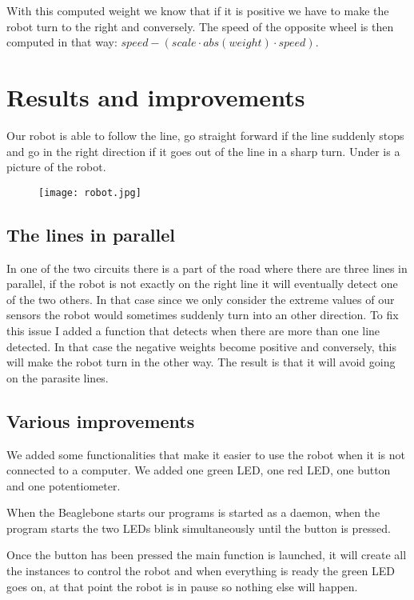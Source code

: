 With this computed weight we know that if it is positive we have to make the robot turn to the right and conversely.
The speed of the opposite wheel is then computed in that way: $speed - (scale \cdot abs(weight) \cdot speed)$.

\section*{Results and improvements}

Our robot is able to follow the line, go straight forward if the line suddenly stops and go in the right direction if it goes out of the line in a sharp turn.
Under is a picture of the robot.

\begin{figure}[h]
    \centering\texttt{[image: robot.jpg]}
\end{figure}

\subsection*{The lines in parallel}

In one of the two circuits there is a part of the road where there are three lines in parallel, if the robot is not exactly on the right line it will eventually detect one of the two others.
In that case since we only consider the extreme values of our sensors the robot would sometimes suddenly turn into an other direction.
To fix this issue I added a function that detects when there are more than one line detected.
In that case the negative weights become positive and conversely, this will make the robot turn in the other way.
The result is that it will avoid going on the parasite lines.

\subsection*{Various improvements}

We added some functionalities that make it easier to use the robot when it is not connected to a computer.
We added one green LED, one red LED, one button and one potentiometer.

When the Beaglebone starts our programs is started as a daemon, when the program starts the two LEDs blink simultaneously until the button is pressed.

Once the button has been pressed the main function is launched, it will create all the instances to control the robot and when everything is ready the green LED goes on, at that point the robot is in pause so nothing else will happen.

